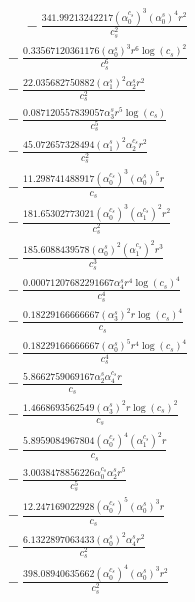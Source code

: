 \documentclass[10pt]{article}
\begin{document}
\begin{align*}
\phantom{R_{3,9}} &\phantom{={}}{}  - \frac{341.99213242217 \left(\alpha_{0}^{c_s}\right)^{3} \left(\alpha_{0}^s\right)^{4} r^{2}}{c_{s}^{2}} \\
&{}  - \frac{0.33567120361176 \left(\alpha_{0}^s\right)^{3} r^{6} \log{\left(c_{s} \right)}^{2}}{c_{s}^{6}} \\
&{}  - \frac{22.035682750882 \left(\alpha_{1}^s\right)^{2} \alpha_{2}^s r^{2}}{c_{s}^{2}} \\
&{}  - \frac{0.087120557839057 \alpha_{3}^s r^{5} \log{\left(c_{s} \right)}}{c_{s}^{5}} \\
&{}  - \frac{45.072657328494 \left(\alpha_{1}^s\right)^{2} \alpha_{2}^{c_s} r^{2}}{c_{s}^{2}} \\
&{}  - \frac{11.298741488917 \left(\alpha_{0}^{c_s}\right)^{3} \left(\alpha_{0}^s\right)^{5} r}{c_{s}} \\
&{}  - \frac{181.65302773021 \left(\alpha_{0}^{c_s}\right)^{3} \left(\alpha_{1}^{c_s}\right)^{2} r^{2}}{c_{s}^{2}} \\
&{}  - \frac{185.6088439578 \left(\alpha_{0}^s\right)^{2} \left(\alpha_{1}^{c_s}\right)^{2} r^{3}}{c_{s}^{3}} \\
&{}  - \frac{0.00071207682291667 \alpha_{4}^s r^{4} \log{\left(c_{s} \right)}^{4}}{c_{s}^{4}} \\
&{}  - \frac{0.18229166666667 \left(\alpha_{3}^s\right)^{2} r \log{\left(c_{s} \right)}^{4}}{c_{s}} \\
&{}  - \frac{0.18229166666667 \left(\alpha_{0}^s\right)^{5} r^{4} \log{\left(c_{s} \right)}^{4}}{c_{s}^{4}} \\
&{}  - \frac{5.8662759069167 \alpha_{2}^s \alpha_{4}^{c_s} r}{c_{s}} \\
&{}  - \frac{1.4668693562549 \left(\alpha_{3}^s\right)^{2} r \log{\left(c_{s} \right)}^{2}}{c_{s}} \\
&{}  - \frac{5.8959084967804 \left(\alpha_{0}^{c_s}\right)^{4} \left(\alpha_{1}^{c_s}\right)^{2} r}{c_{s}} \\
&{}  - \frac{3.0038478856226 \alpha_{0}^{c_s} \alpha_{2}^s r^{5}}{c_{s}^{5}} \\
&{}  - \frac{12.247169022928 \left(\alpha_{0}^{c_s}\right)^{5} \left(\alpha_{0}^s\right)^{3} r}{c_{s}} \\
&{}  - \frac{6.1322897063433 \left(\alpha_{0}^s\right)^{2} \alpha_{4}^s r^{2}}{c_{s}^{2}} \\
&{}  - \frac{398.08940635662 \left(\alpha_{0}^{c_s}\right)^{4} \left(\alpha_{0}^s\right)^{3} r^{2}}{c_{s}^{2}} \\

\end{align*}
\end{document}
